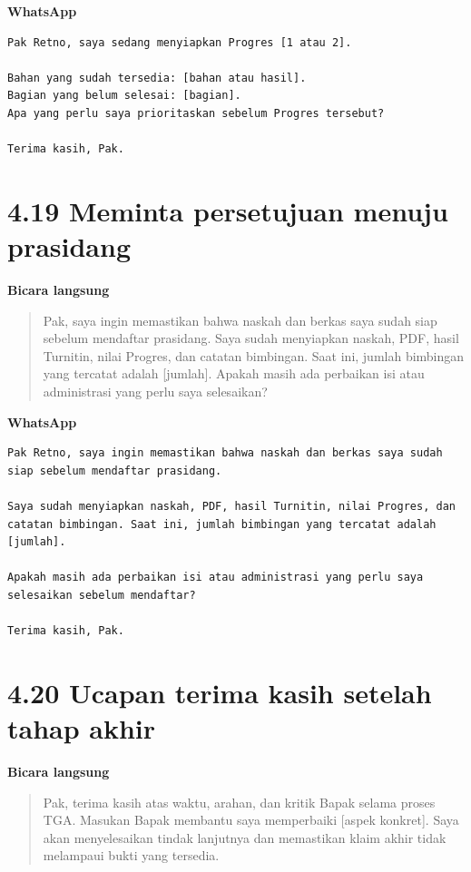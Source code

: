 \documentclass[
  indonesian,
]{article}
\renewcommand{\subsection}{\section}
\begin{document}
\textbf{WhatsApp}

\begin{verbatim}
Pak Retno, saya sedang menyiapkan Progres [1 atau 2].

Bahan yang sudah tersedia: [bahan atau hasil].
Bagian yang belum selesai: [bagian].
Apa yang perlu saya prioritaskan sebelum Progres tersebut?

Terima kasih, Pak.
\end{verbatim}

\subsection{4.19 Meminta persetujuan menuju
prasidang}\label{meminta-persetujuan-menuju-prasidang}

\textbf{Bicara langsung}

\begin{quote}
Pak, saya ingin memastikan bahwa naskah dan berkas saya sudah siap
sebelum mendaftar prasidang. Saya sudah menyiapkan naskah, PDF, hasil
Turnitin, nilai Progres, dan catatan bimbingan. Saat ini, jumlah
bimbingan yang tercatat adalah {[}jumlah{]}. Apakah masih ada perbaikan
isi atau administrasi yang perlu saya selesaikan?
\end{quote}

\textbf{WhatsApp}

\begin{verbatim}
Pak Retno, saya ingin memastikan bahwa naskah dan berkas saya sudah siap sebelum mendaftar prasidang.

Saya sudah menyiapkan naskah, PDF, hasil Turnitin, nilai Progres, dan catatan bimbingan. Saat ini, jumlah bimbingan yang tercatat adalah [jumlah].

Apakah masih ada perbaikan isi atau administrasi yang perlu saya selesaikan sebelum mendaftar?

Terima kasih, Pak.
\end{verbatim}

\subsection{4.20 Ucapan terima kasih setelah tahap
akhir}\label{ucapan-terima-kasih-setelah-tahap-akhir}

\textbf{Bicara langsung}

\begin{quote}
Pak, terima kasih atas waktu, arahan, dan kritik Bapak selama proses
TGA. Masukan Bapak membantu saya memperbaiki {[}aspek konkret{]}. Saya
akan menyelesaikan tindak lanjutnya dan memastikan klaim akhir tidak
melampaui bukti yang tersedia.
\end{quote}
\end{document}
